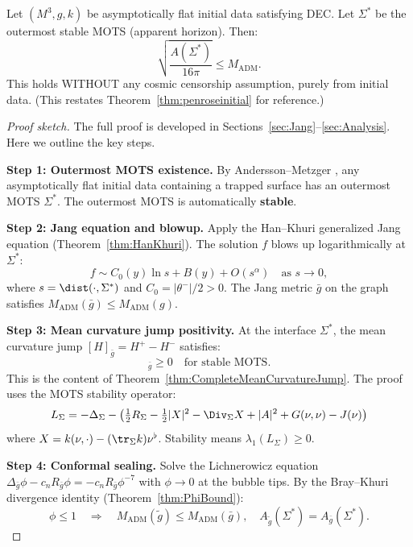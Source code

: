 \begin{theorem}\label{thm:penroseinitialRestate}
Let $(M^3, g, k)$ be asymptotically flat initial data satisfying DEC. Let $\Sigma^*$ be the outermost stable MOTS (apparent horizon). Then:
\begin{equation}
    \sqrt{\frac{A(\Sigma^*)}{16\pi}} \leq M_{\mathrm{ADM}}.
\end{equation}
This holds WITHOUT any cosmic censorship assumption, purely from initial data. \textup{(}This restates Theorem~\ref{thm:penroseinitial} for reference.\textup{)}
\end{theorem}

\begin{proof}[Proof sketch]
The full proof is developed in Sections~\ref{sec:Jang}--\ref{sec:Analysis}. Here we outline the key steps.

\textbf{Step 1: Outermost MOTS existence.}
By Andersson--Metzger \cite{anderssonmetzger2009}, any asymptotically flat initial data containing a trapped surface has an outermost MOTS $\Sigma^*$. The outermost MOTS is automatically \textbf{stable}.

\textbf{Step 2: Jang equation and blowup.}
Apply the Han--Khuri generalized Jang equation (Theorem~\ref{thm:HanKhuri}). The solution $f$ blows up logarithmically at $\Sigma^*$:
\begin{equation}
    f \sim C_0(y) \ln s + B(y) + O(s^\alpha) \quad \text{as } s \to 0,
\end{equation}
where $s = \dist(\cdot, \Sigma^*)$ and $C_0 = |\theta^-|/2 > 0$. The Jang metric $\bar{g}$ on the graph satisfies $M_{\mathrm{ADM}}(\bar{g}) \leq M_{\mathrm{ADM}}(g)$.

\textbf{Step 3: Mean curvature jump positivity.}
At the interface $\Sigma^*$, the mean curvature jump $[H]_{\bar{g}} = H^+ - H^-$ satisfies:
\begin{equation}
    [H]_{\bar{g}} \geq 0 \quad \text{for stable MOTS}.
\end{equation}
This is the content of Theorem~\ref{thm:CompleteMeanCurvatureJump}. The proof uses the MOTS stability operator:
\begin{equation}
    L_\Sigma = -\Delta_\Sigma - \left( \tfrac{1}{2}R_\Sigma - \tfrac{1}{2}|X|^2 - \Div_\Sigma X + |A|^2 + G(\nu, \nu) - J(\nu) \right)
\end{equation}
where $X = k(\nu, \cdot) - (\tr_\Sigma k)\nu^\flat$. Stability means $\lambda_1(L_\Sigma) \geq 0$.

\textbf{Step 4: Conformal sealing.}
Solve the Lichnerowicz equation $\Delta_{\bar{g}} \phi - c_n R_{\bar{g}} \phi = -c_n R_{\bar{g}} \phi^{-7}$ with $\phi \to 0$ at the bubble tips. By the Bray--Khuri divergence identity (Theorem~\ref{thm:PhiBound}):
\begin{equation}
    \phi \leq 1 \quad \Rightarrow \quad M_{\mathrm{ADM}}(\tilde{g}) \leq M_{\mathrm{ADM}}(\bar{g}), \quad A_{\tilde{g}}(\Sigma^*) = A_{\bar{g}}(\Sigma^*).
\end{equation}


\end{proof}
